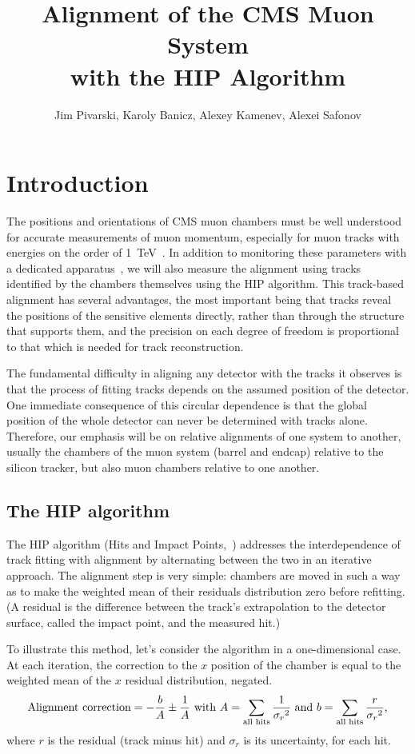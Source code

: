 \documentclass[12pt]{article}
\title{Alignment of the CMS Muon System \\ with the HIP Algorithm}
\author{Jim Pivarski, Karoly Banicz, Alexey Kamenev, Alexei Safonov}
\begin{document}
\maketitle

\section{Introduction}

The positions and orientations of CMS muon chambers must be well
understood for accurate measurements of muon momentum, especially for
muon tracks with energies on the order of
1~TeV~\cite{alignment_needed_for_tev}.  In addition to monitoring
these parameters with a dedicated apparatus~\cite{hardware_alignment},
we will also measure the alignment using tracks identified by the
chambers themselves using the HIP algorithm.  This track-based
alignment has several advantages, the most important being that tracks
reveal the positions of the sensitive elements directly, rather than
through the structure that supports them, and the precision on each
degree of freedom is proportional to that which is needed for track
reconstruction.

The fundamental difficulty in aligning any detector with the tracks it
observes is that the process of fitting tracks depends on the assumed
position of the detector.  One immediate consequence of this circular
dependence is that the global position of the whole detector can never
be determined with tracks alone.  Therefore, our emphasis will be on
relative alignments of one system to another, usually the chambers of
the muon system (barrel and endcap) relative to the silicon tracker,
but also muon chambers relative to one another.

\subsection{The HIP algorithm}

The HIP algorithm (Hits and Impact Points,~\cite{hip_algorithm})
addresses the interdependence of track fitting with alignment by
alternating between the two in an iterative approach.  The alignment
step is very simple: chambers are moved in such a way as to make the
weighted mean of their residuals distribution zero before refitting.
(A residual is the difference between the track's extrapolation to the
detector surface, called the impact point, and the measured hit.)

To illustrate this method, let's consider the algorithm in a
one-dimensional case.  At each iteration, the correction to the
$x$ position of the chamber is equal to the weighted mean of the $x$
residual distribution, negated.
\begin{equation}
\mbox{Alignment correction} = -\frac{b}{A} \pm \frac{1}{A} \mbox{ with } A =
\sum_{\mbox{\scriptsize all hits}} \frac{1}{{\sigma_r}^2}
\mbox{ and } b = \sum_{\mbox{\scriptsize all hits}} \frac{r}{{\sigma_r}^2} \mbox{,}
\label{weighted_mean}
\end{equation}
where $r$ is the residual (track minus hit) and $\sigma_r$
is its uncertainty, for each hit.
\end{document}
